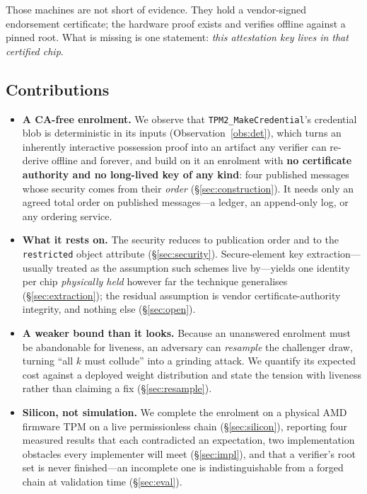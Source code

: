 \documentclass[conference,10pt]{IEEEtran}
\begin{document}
Those machines are not short of evidence. They hold a vendor-signed endorsement certificate; the
hardware proof exists and verifies offline against a pinned root. What is missing is one statement:
\emph{this attestation key lives in that certified chip}.

\subsection{Contributions}

\begin{itemize}
  \item \textbf{A CA-free enrolment.} We observe that \texttt{TPM2\_MakeCredential}'s credential blob
        is deterministic in its inputs (Observation~\ref{obs:det}), which turns an inherently
        interactive possession proof into an artifact any verifier can re-derive offline and forever,
        and build on it an enrolment with \textbf{no certificate authority and no long-lived key of any
        kind}: four published messages whose security comes from their \emph{order}
        (\S\ref{sec:construction}). It needs only an agreed total order on published messages---a
        ledger, an append-only log, or any ordering service.
  \item \textbf{What it rests on.} The security reduces to publication order and to the
        \texttt{restricted} object attribute (\S\ref{sec:security}). Secure-element key
        extraction---usually treated as the assumption such schemes live by---yields one identity per
        chip \emph{physically held} however far the technique generalises (\S\ref{sec:extraction}); the
        residual assumption is vendor certificate-authority integrity, and nothing else
        (\S\ref{sec:open}).
  \item \textbf{A weaker bound than it looks.} Because an unanswered enrolment must be abandonable for
        liveness, an adversary can \emph{resample} the challenger draw, turning ``all $k$ must collude''
        into a grinding attack. We quantify its expected cost against a deployed weight distribution and
        state the tension with liveness rather than claiming a fix (\S\ref{sec:resample}).
  \item \textbf{Silicon, not simulation.} We complete the enrolment on a physical AMD firmware TPM on a
        live permissionless chain (\S\ref{sec:silicon}), reporting four measured results that each
        contradicted an expectation, two implementation obstacles every implementer will meet
        (\S\ref{sec:impl}), and that a verifier's root set is never finished---an incomplete one is
        indistinguishable from a forged chain at validation time (\S\ref{sec:eval}).
\end{itemize}
\end{document}
